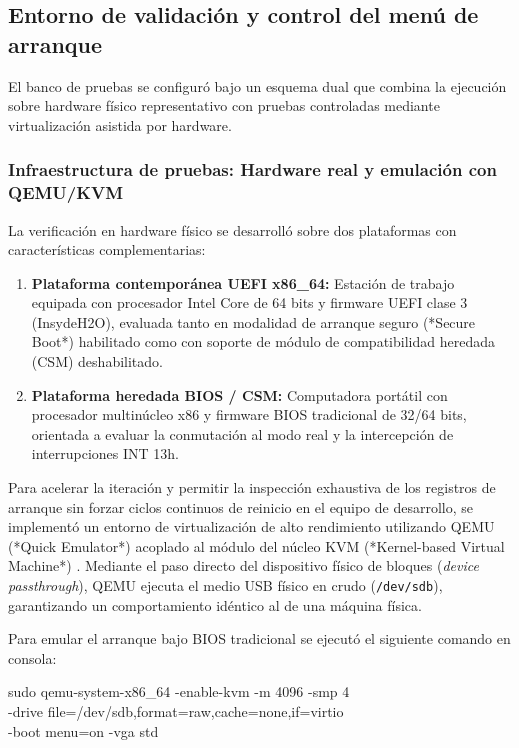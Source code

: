 \documentclass[12pt]{article}
\begin{document}
\subsection{Entorno de validación y control del menú de arranque}
\label{sec:entornoValidacion}

El banco de pruebas se configuró bajo un esquema dual que combina la ejecución sobre hardware físico representativo con pruebas controladas mediante virtualización asistida por hardware.

\subsubsection{Infraestructura de pruebas: Hardware real y emulación con QEMU/KVM}

La verificación en hardware físico se desarrolló sobre dos plataformas con características complementarias:
\begin{enumerate}[noitemsep, topsep=2pt]
    \item \textbf{Plataforma contemporánea UEFI x86\_64:} Estación de trabajo equipada con procesador Intel Core de 64 bits y firmware UEFI clase 3 (InsydeH2O), evaluada tanto en modalidad de arranque seguro (*Secure Boot*) habilitado como con soporte de módulo de compatibilidad heredada (CSM) deshabilitado.
    \item \textbf{Plataforma heredada BIOS / CSM:} Computadora portátil con procesador multinúcleo x86 y firmware BIOS tradicional de 32/64 bits, orientada a evaluar la conmutación al modo real y la intercepción de interrupciones INT 13h.
\end{enumerate}

Para acelerar la iteración y permitir la inspección exhaustiva de los registros de arranque sin forzar ciclos continuos de reinicio en el equipo de desarrollo, se implementó un entorno de virtualización de alto rendimiento utilizando QEMU (*Quick Emulator*) acoplado al módulo del núcleo KVM (*Kernel-based Virtual Machine*) \parencite{qemu2024documentation}. Mediante el paso directo del dispositivo físico de bloques (\textit{device passthrough}), QEMU ejecuta el medio USB físico en crudo (\texttt{/dev/sdb}), garantizando un comportamiento idéntico al de una máquina física.

Para emular el arranque bajo BIOS tradicional se ejecutó el siguiente comando en consola:

\begin{mdframed}[style=terminal]
\ttfamily\upshape\color{bashLetterColor}\footnotesize
sudo qemu-system-x86\_64 -enable-kvm -m 4096 -smp 4 \\
\hspace*{1em}-drive file=/dev/sdb,format=raw,cache=none,if=virtio \\
\hspace*{1em}-boot menu=on -vga std
\end{mdframed}
\end{document}
